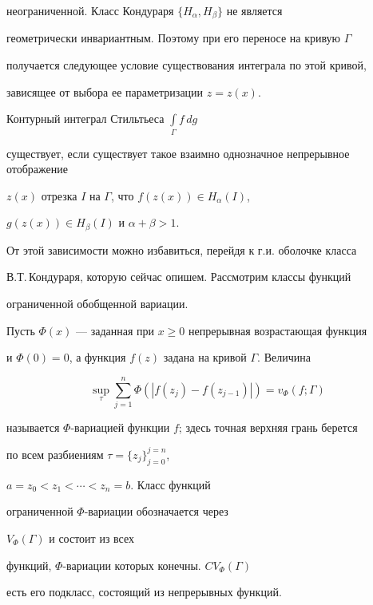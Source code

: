 неограниченной. Класс Кондураря $\{H_{\alpha}, H_{\beta}\}$ не является


геометрически инвариантным. Поэтому при его переносе на кривую $\Gamma$


получается следующее условие существования интеграла по этой кривой,


зависящее от выбора ее параметризации $z=z(x)$.





\begin{prop}


Контурный интеграл Стильтьеса $\int\limits_{\Gamma}f\,dg$


существует, если существует такое взаимно однозначное непрерывное отображение


$z(x)$ отрезка $I$ на $\Gamma$, что $f(z(x))\in H_{\alpha}(I)$,


$g(z(x))\in H_{\beta}(I)$ и $\alpha +\beta >1$.


\end{prop}





От этой зависимости можно избавиться, перейдя к г.и. оболочке класса


В.Т.\,Кондураря, которую сейчас опишем. Рассмотрим классы функций


ограниченной обобщенной вариации.





\begin{defn}


Пусть $\Phi (x)$ --- заданная при $x\ge 0$ непрерывная возрастающая функция


и $\Phi (0)=0$, а функция $f(z)$ задана на кривой $\Gamma$. Величина


$$


\sup_{\tau}\sum_{j=1}^{n}\Phi(|f(z_{j})-f(z_{j-1})|) =


v_{\Phi}(f;\Gamma)


$$


называется $\Phi$-вариацией функции $f$; здесь точная верхняя грань берется


по всем разбиениям $\tau = \{z_{j}\}_{j=0}^{j=n}$,


$a=z_{0}<z_{1}<\dotsb<z_{n}=b$. Класс функций


ограниченной $\Phi$-вариации обозначается через


$V_{\Phi}(\Gamma)$ и состоит из всех


функций, $\Phi$-вариации которых конечны. $CV_{\Phi}(\Gamma)$


есть его подкласс, состоящий из непрерывных функций.


\end{defn}





